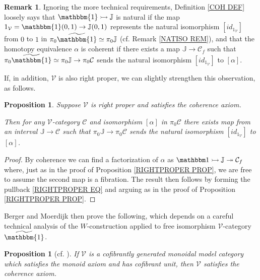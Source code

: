 \documentclass[a4paper,10pt
,draft
]{article}%
\numberwithin{equation}{section}
\numberwithin{figure}{section}
\newtheorem{proposition}[equation]{Proposition}%
\theoremstyle{definition} %
\newtheorem{remark}[equation]{Remark}%
\newcommand{\V}{\ensuremath{\mathcal V}}
\newcommand{\1}{\ensuremath{\mathbbm 1}}%
\begin{document}
\begin{remark}
Ignoring the more technical requirements,
Definition \ref{COH DEF} loosely says that  
$\mathbbm{1} \rightarrowtail \mathbb{J}$
is natural if the map $1_{\V} = \mathbbm{1}(0,1) \to \mathbb{J}(0,1)$
represents the natural isomorphism
$[id_{1_{\V}}]$ from $0$ to $1$ in $ \pi_0 \widetilde{\mathbbm{1}} \simeq \pi_0 \mathbb{J}$ (cf. Remark \ref{NATISO REM}),
%
and that the homotopy equivalence $\alpha$ is coherent
if there exists a map $\mathbb{J} \to \mathcal C_f$
such that
$\pi_0 \widetilde{\mathbbm{1}} \simeq
\pi_0 \mathbb{J} \to \pi_0 \mathcal C$
sends the natural isomorphism $[id_{1_{\V}}]$ to $[\alpha]$.

If, in addition, $\V$ is also right proper, we can slightly strengthen this observation, as follows.
\end{remark}



\begin{proposition}\label{ALTCOH PROP}
Suppose $\V$ is right proper and satisfies the coherence axiom.

Then for any $\V$-category $\mathcal{C}$ and isomorphism  
$[\alpha]$ in $\pi_0 \mathcal{C}$
there exists map from an interval 
$\mathbb{J} \to \mathcal{C}$
such that 
$\pi_0 \mathbb{J} \to \pi_0\mathcal{C}$
sends the natural isomorphism $[id_{1_{\V}}]$ to $[\alpha]$.
\end{proposition}



\begin{proof}
By coherence we can find a factorization of 
$\alpha$ as 
$\1 \rightarrowtail \mathbb J \twoheadrightarrow \mathcal C_f$
where, just as in the proof of
Proposition \ref{RIGHTPROPER PROP},
we are free to assume the second map is a fibration.
The result then follows by forming the pullback \eqref{RIGHTPROPER EQ} and arguing as in the proof of Proposition \ref{RIGHTPROPER PROP}.
\end{proof}





Berger and Moerdijk then prove the following,
which depends on a careful technical analysis of the $W$-construction applied to free isomorphism $\V$-category
$\widetilde{\mathbbm{1}}$.



 

\begin{proposition}[{cf. \cite[Prop. 2.24]{BM13}}]
\label{COHAX PROP}
If $\V$ is a cofibrantly generated monoidal model category 
which satisfies the monoid axiom and has cofibrant unit,
then $\V$ satisfies the coherence axiom.
\end{proposition}
\end{document}
